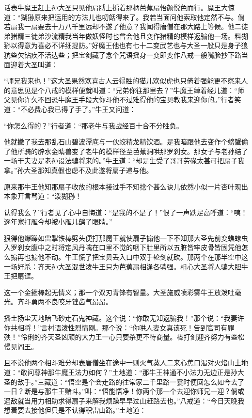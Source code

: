 \documentclass[12pt,UTF8]{ctexbook}
\begin{document}
话表牛魔王赶上孙大圣只见他肩膊上掮着那柄芭蕉扇怡颜悦色而行。魔王大惊道：“猢狲原来把运用的方法儿也叨餂得来了。我若当面问他索取他定然不与。倘若扇我一扇要去十万八千里远却不遂了他意？我闻得唐僧在那大路上等候。他二徒弟猪精三徒弟沙流精我当年做妖怪时也曾会他且变作猪精的模样返骗他一场。料猢狲以得意为喜必不详细提防。”好魔王他也有七十二变武艺也与大圣一般只是身子狼犺些欠钻疾不活达些；把宝剑藏了念个咒语摇身一变即变作八戒一般嘴脸抄下路当面迎着大圣叫道：

“师兄我来也！”这大圣果然欢喜古人云得胜的猫儿欢似虎也只倚着强能更不察来人的意思见是个八戒的模样便就叫道：“兄弟你往那里去？”牛魔王绰着经儿道：“师父见你许久不回恐牛魔王手段大你斗他不过难得他的宝贝教我来迎你的。”行者笑道：“不必费心我已得了手了。”牛王又问道：

“你怎么得的？”行者道：“那老牛与我战经百十合不分胜负。

他就撇了我去那乱石山碧波潭底与一伙蛟精龙精饮酒。是我暗跟他去变作个螃蟹偷了他所骑的辟水金睛兽变了老牛的模样径至芭蕉洞哄那罗刹女。那女子与老孙结了一场干夫妻是老孙设法骗将来的。”牛王道：“却是生受了哥哥劳碌太甚可把扇子我拿。”孙大圣那知真假也虑不及此遂将扇子递与他。

原来那牛王他知那扇子收放的根本接过手不知捻个甚么诀儿依然小似一片杏叶现出本象开言骂道：“泼猢狲！

认得我么？”行者见了心中自悔道：“是我的不是了！”恨了一声跌足高呼道：“咦！逐年家打雁今却被小雁儿鹐了眼睛。”

狠得他爆躁如雷掣铁棒劈头便打那魔王就使扇子搧他一下不知那大圣先前变蟭蟟虫入罗刹女腹中之时将定风丹噙在口里不觉的咽下肚里所以五脏皆牢皮骨皆固凭他怎么搧再也搧他不动。牛王慌了把宝贝丢入口中双手轮剑就砍。那两个在那半空中这一场好杀：齐天孙大圣混世泼牛王只为芭蕉扇相逢各骋强。粗心大圣将人骗大胆牛王把扇诓。

这一个金箍棒起无情义；那一个双刃青锋有智量。大圣施威喷彩雾牛王放泼吐毫光。齐斗勇两不良咬牙锉齿气昂昂。

播土扬尘天地暗飞砂走石鬼神藏。这个说：“你敢无知返骗我！”那个说：“我妻许你共相将！”言村语泼性烈情刚。那个说：“你哄人妻女真该死！告到官司有罪殃！”伶俐的齐天圣凶顽的大力王一心只要杀更不待商量。棒打剑迎齐努力有些松慢见阎王。

且不说他两个相斗难分却表唐僧坐在途中一则火气蒸人二来心焦口渴对火焰山土地道：“敢问尊神那牛魔王法力如何？”土地道：“那牛王神通不小法力无边正是孙大圣的敌手。”三藏道：“悟空是个会走路的往常家二千里路一霎时便回怎么如今去了一日？断是与那牛王赌斗。”叫：“悟能悟净！你两个那一个去迎你师兄一迎？倘或遇敌就当用力相助求得扇子来解我烦躁早早过山赶路去也。”八戒道：“今日天晚我想着要去接他但只是不认得积雷山路。”土地道：
\end{document}
